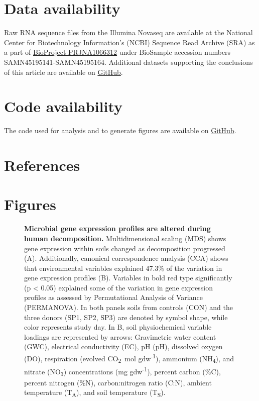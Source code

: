 \documentclass[
  sn-nature,
  lineno, referee]{sn-jnl}
\begin{document}
\section{Data availability}\label{data-availability}

Raw RNA sequence files from the Illumina Novaseq are available at the
National Center for Biotechnology Information's (NCBI) Sequence Read
Archive (SRA) as a part of
\href{https://www.ncbi.nlm.nih.gov/bioproject/PRJNA1066312/}{BioProject
PRJNA1066312} under BioSample accession numbers
SAMN45195141-SAMN45195164. Additional datasets supporting the
conclusions of this article are available on
\href{https://github.com/amason30/Mason_MetaT_XXX_2024}{GitHub}.

\section{Code availability}\label{code-availability}

The code used for analysis and to generate figures are available on
\href{https://github.com/amason30/Mason_MetaT_XXX_2024}{GitHub}.

\section{References}\label{references}

\renewcommand{\bibsection}{}


\newpage

\section{Figures}\label{figures}

\begin{figure}[!h]
\caption{{\bf Microbial gene expression profiles are altered during human decomposition.}
Multidimensional scaling (MDS) shows gene expression within soils changed as decomposition progressed (A). Additionally, canonical correspondence analysis (CCA) shows that environmental variables explained 47.3\% of the variation in gene expression profiles (B). Variables in bold red type significantly (p < 0.05) explained some of the variation in gene expression profiles as assessed by Permutational Analysis of Variance (PERMANOVA). In both panels soils from controls (CON) and the three donors (SP1, SP2, SP3) are denoted by symbol shape, while color represents study day. In B, soil physiochemical variable loadings are represented by arrows: Gravimetric water content (GWC), electrical conductivity (EC), pH (pH), dissolved oxygen (DO), respiration (evolved CO\textsubscript{2}\ \textmu mol gdw\textsuperscript{-1}), ammonium (NH\textsubscript{4}), and nitrate (NO\textsubscript{3}) concentrations (mg gdw\textsuperscript{-1}), percent carbon (\%C), percent nitrogen (\%N), carbon:nitrogen ratio (C:N), ambient temperature (T\textsubscript{A}), and soil temperature (T\textsubscript{S}).}
\label{fig-mds}
\end{figure}
\end{document}

